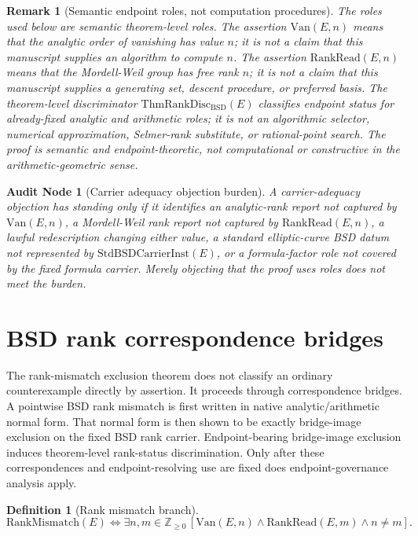 \documentclass[11pt]{article}
\newtheorem{definition}[theorem]{Definition}
\newtheorem{audit}[theorem]{Audit Node}
\newtheorem{remark}[theorem]{Remark}
\newcommand{\Z}{\mathbb{Z}}
\newcommand{\BSD}{\mathrm{BSD}}
\newcommand{\Van}{\mathrm{Van}}
\newcommand{\RankRead}{\mathrm{RankRead}}
\newcommand{\RankMismatch}{\mathrm{RankMismatch}}
\newcommand{\ThmRankDisc}{\mathrm{ThmRankDisc}_{\BSD}}
\begin{document}
\begin{remark}[Semantic endpoint roles, not computation procedures]\label{rem:semantic-endpoint-roles}
The roles used below are semantic theorem-level roles. The assertion $\Van(E,n)$ means that the analytic order of vanishing has value $n$; it is not a claim that this manuscript supplies an algorithm to compute $n$. The assertion $\RankRead(E,n)$ means that the Mordell-Weil group has free rank $n$; it is not a claim that this manuscript supplies a generating set, descent procedure, or preferred basis. The theorem-level discriminator $\ThmRankDisc(E)$ classifies endpoint status for already-fixed analytic and arithmetic roles; it is not an algorithmic selector, numerical approximation, Selmer-rank substitute, or rational-point search. The proof is semantic and endpoint-theoretic, not computational or constructive in the arithmetic-geometric sense.
\end{remark}

\begin{audit}[Carrier adequacy objection burden]
A carrier-adequacy objection has standing only if it identifies an analytic-rank report not captured by $\Van(E,n)$, a Mordell-Weil rank report not captured by $\RankRead(E,n)$, a lawful redescription changing either value, a standard elliptic-curve BSD datum not represented by $\mathrm{StdBSDCarrierInst}(E)$, or a formula-factor role not covered by the fixed formula carrier. Merely objecting that the proof uses roles does not meet the burden.
\end{audit}


\section{BSD rank correspondence bridges}

The rank-mismatch exclusion theorem does not classify an ordinary counterexample directly by assertion. It proceeds through correspondence bridges. A pointwise BSD rank mismatch is first written in native analytic/arithmetic normal form. That normal form is then shown to be exactly bridge-image exclusion on the fixed BSD rank carrier. Endpoint-bearing bridge-image exclusion induces theorem-level rank-status discrimination. Only after these correspondences and endpoint-resolving use are fixed does endpoint-governance analysis apply.

\begin{definition}[Rank mismatch branch]
\[
\RankMismatch(E)
\Longleftrightarrow
\exists n,m\in\Z_{\ge0}\,[\Van(E,n)\wedge\RankRead(E,m)\wedge n\neq m].
\]
\end{definition}
\end{document}
